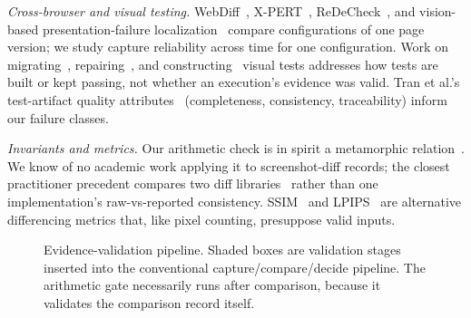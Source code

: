 \documentclass[conference]{IEEEtran}
\begin{document}
\textit{Cross-browser and visual testing.} WebDiff~\cite{webdiff}, X-PERT~\cite{xpert}, ReDeCheck~\cite{redecheck}, and vision-based presentation-failure localization~\cite{mahajan2015} compare configurations of one page version; we study capture reliability across time for one configuration. Work on migrating~\cite{pesto}, repairing~\cite{stocco2018}, and constructing~\cite{bajammal2018} visual tests addresses how tests are built or kept passing, not whether an execution's evidence was valid. Tran et al.'s test-artifact quality attributes~\cite{tran2021} (completeness, consistency, traceability) inform our failure classes.

\textit{Invariants and metrics.} Our arithmetic check is in spirit a metamorphic relation~\cite{chen1998}. We know of no academic work applying it to screenshot-diff records; the closest practitioner precedent compares two diff libraries~\cite{resemble} rather than one implementation's raw-vs-reported consistency. SSIM~\cite{wang2004} and LPIPS~\cite{zhang2018} are alternative differencing metrics that, like pixel counting, presuppose valid inputs.

\begin{figure}[!t]
\centering
{}
\caption{Evidence-validation pipeline. Shaded boxes are validation stages inserted into the conventional capture/compare/decide pipeline. The arithmetic gate necessarily runs after comparison, because it validates the comparison record itself.}
\label{fig:pipeline}
\end{figure}
\end{document}
